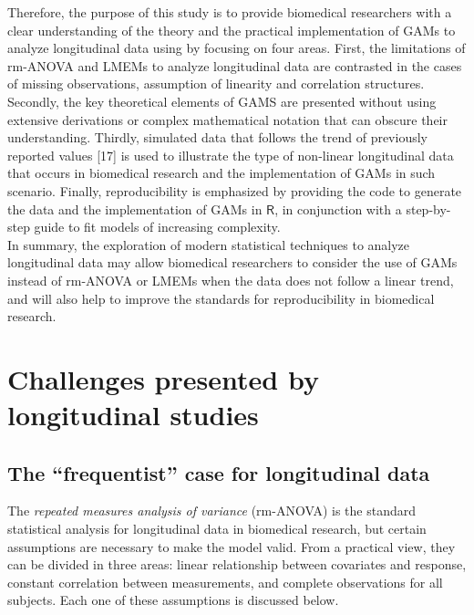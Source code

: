 \documentclass[
]{article}
\begin{document}
Therefore, the purpose of this study is to provide biomedical researchers with a clear understanding of the theory and the practical implementation of GAMs to analyze longitudinal data using by focusing on four areas. First, the limitations of rm-ANOVA and LMEMs to analyze longitudinal data are contrasted in the cases of missing observations, assumption of linearity and correlation structures. Secondly, the key theoretical elements of GAMS are presented without using extensive derivations or complex mathematical notation that can obscure their understanding. Thirdly, simulated data that follows the trend of previously reported values {[}17{]} is used to illustrate the type of non-linear longitudinal data that occurs in biomedical research and the implementation of GAMs in such scenario. Finally, reproducibility is emphasized by providing the code to generate the data and the implementation of GAMs in \(\textsf{R}\), in conjunction with a step-by-step guide to fit models of increasing complexity.\\
In summary, the exploration of modern statistical techniques to analyze longitudinal data may allow biomedical researchers to consider the use of GAMs instead of rm-ANOVA or LMEMs when the data does not follow a linear trend, and will also help to improve the standards for reproducibility in biomedical research.

\hypertarget{challenges-presented-by-longitudinal-studies}{%
\section{Challenges presented by longitudinal studies}\label{challenges-presented-by-longitudinal-studies}}

\hypertarget{the-frequentist-case-for-longitudinal-data}{%
\subsection{The ``frequentist'' case for longitudinal data}\label{the-frequentist-case-for-longitudinal-data}}

The \emph{repeated measures analysis of variance} (rm-ANOVA) is the standard statistical analysis for longitudinal data in biomedical research, but certain assumptions are necessary to make the model valid. From a practical view, they can be divided in three areas: linear relationship between covariates and response, constant correlation between measurements, and complete observations for all subjects. Each one of these assumptions is discussed below.
\end{document}
